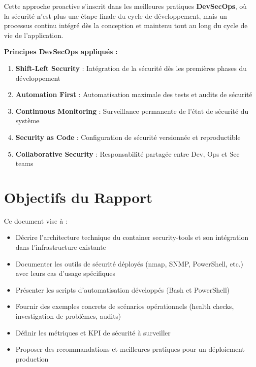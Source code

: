 \documentclass[11pt,a4paper]{report}
\begin{document}
Cette approche proactive s'inscrit dans les meilleures pratiques \textbf{DevSecOps}, où la sécurité n'est plus une étape finale du cycle de développement, mais un processus continu intégré dès la conception et maintenu tout au long du cycle de vie de l'application.

\textbf{Principes DevSecOps appliqués :}
\begin{enumerate}
    \item \textbf{Shift-Left Security} : Intégration de la sécurité dès les premières phases du développement
    \item \textbf{Automation First} : Automatisation maximale des tests et audits de sécurité
    \item \textbf{Continuous Monitoring} : Surveillance permanente de l'état de sécurité du système
    \item \textbf{Security as Code} : Configuration de sécurité versionnée et reproductible
    \item \textbf{Collaborative Security} : Responsabilité partagée entre Dev, Ops et Sec teams
\end{enumerate}

\section{Objectifs du Rapport}

Ce document vise à :
\begin{itemize}
    \item Décrire l'architecture technique du container security-tools et son intégration dans l'infrastructure existante
    \item Documenter les outils de sécurité déployés (nmap, SNMP, PowerShell, etc.) avec leurs cas d'usage spécifiques
    \item Présenter les scripts d'automatisation développés (Bash et PowerShell)
    \item Fournir des exemples concrets de scénarios opérationnels (health checks, investigation de problèmes, audits)
    \item Définir les métriques et KPI de sécurité à surveiller
    \item Proposer des recommandations et meilleures pratiques pour un déploiement production
\end{itemize}

\end{document}
